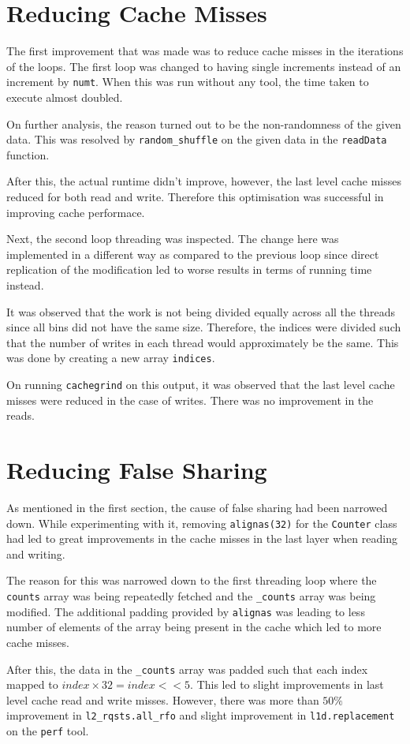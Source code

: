 \documentclass[11pt]{article}
\begin{document}
\section{Reducing Cache Misses}
The first improvement that was made was to reduce cache misses in the iterations of the loops. The first loop was changed to having single increments instead of an increment by \texttt{numt}. When this was run without any tool, the time taken to execute almost doubled.\par
On further analysis, the reason turned out to be the non-randomness of the given data. This was resolved by \texttt{random\_shuffle} on the given data in the \texttt{readData} function.\par
After this, the actual runtime didn't improve, however, the last level cache misses reduced for both read and write. Therefore this optimisation was successful in improving cache performace.\par
Next, the second loop threading was inspected. The change here was implemented in a different way as compared to the previous loop since direct replication of the modification led to worse results in terms of running time instead.\par
It was observed that the work is not being divided equally across all the threads since all bins did not have the same size. Therefore, the indices were divided such that the number of writes in each thread would approximately be the same. This was done by creating a new array \texttt{indices}.\par
On running \texttt{cachegrind} on this output, it was observed that the last level cache misses were reduced in the case of writes. There was no improvement in the reads.

\section{Reducing False Sharing}
As mentioned in the first section, the cause of false sharing had been narrowed down. While experimenting with it, removing \texttt{alignas(32)} for the \texttt{Counter} class had led to great improvements in the cache misses in the last layer when reading and writing.\par
The reason for this was narrowed down to the first threading loop where the \texttt{counts} array was being repeatedly fetched and the \texttt{\_counts} array was being modified. The additional padding provided by \texttt{alignas} was leading to less number of elements of the array being present in the cache which led to more cache misses.\par
After this, the data in the \texttt{\_counts} array was padded such that each index mapped to $index \times 32 = index << 5$. This led to slight improvements in last level cache read and write misses. However, there was more than $50\%$ improvement in \texttt{l2\_rqsts.all\_rfo} and slight improvement in \texttt{l1d.replacement} on the \texttt{perf} tool.
\end{document}
